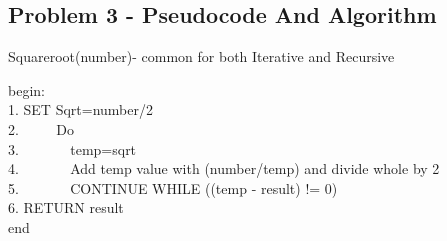 \documentclass[a4paper,12pt]{article}
\begin{document}
\begin{titlepage}
\section{Problem 3 - Pseudocode And Algorithm}
\newpage
\begin{algorithm}
\caption{Squareroot(number)- common for both Iterative and Recursive}
begin: \\
1. SET Sqrt=number/2\\
2. $\hspace{2em}$ Do\\
3. $\hspace{3em}$ temp=sqrt\\
4. $\hspace{3em}$ Add temp value with (number/temp) and divide whole by 2\\
5. $\hspace{3em}$ CONTINUE WHILE ((temp - result) != 0)\\
6. RETURN result\\
end
\end{algorithm}

\end{titlepage}
\end{document}
